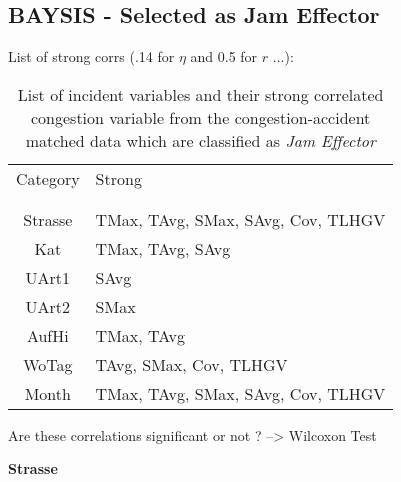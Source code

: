 \subsection{BAYSIS - Selected as Jam Effector}

List of strong corrs (.14 for $\eta$ and 0.5 for $r$ ...):

\noindent
\begin{table}[h!]
	\centering
	\begin{tabular}{c|l}  
		Category & Strong \\
		\\[-1em]
		\hline
		\\[-1em]
		Strasse & TMax, TAvg, SMax, SAvg, Cov, TLHGV \\ 
 		Kat & TMax, TAvg, SAvg \\ 
 		UArt1 & SAvg \\
 		UArt2 & SMax \\
 		AufHi & TMax, TAvg \\
 		WoTag & TAvg, SMax, Cov, TLHGV \\
 		Month & TMax, TAvg, SMax, SAvg, Cov, TLHGV \\
	\end{tabular}
    \caption{List of incident variables and their strong correlated congestion variable from the congestion-accident matched data which are classified as \textit{Jam Effector}}
	\label{tbl:correlation_list_baysis_effector}
\end{table}

Are these correlations significant or not ? --> Wilcoxon Test

\large
\centerline{\textbf{Strasse}}
\normalsize

